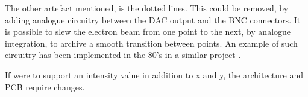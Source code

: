 The other artefact mentioned, is the dotted lines.
This could be removed, by adding analogue circuitry between the DAC output and the BNC connectors.
It is possible to slew the electron beam from one point to the next, by analogue integration, to archive a smooth transition between points.
An example of such circuitry has been implemented in the 80's in a similar project \cite{vector-graphic-crt}.


If \vthreek were to support an intensity value in addition to x and y, the architecture and PCB require changes.
